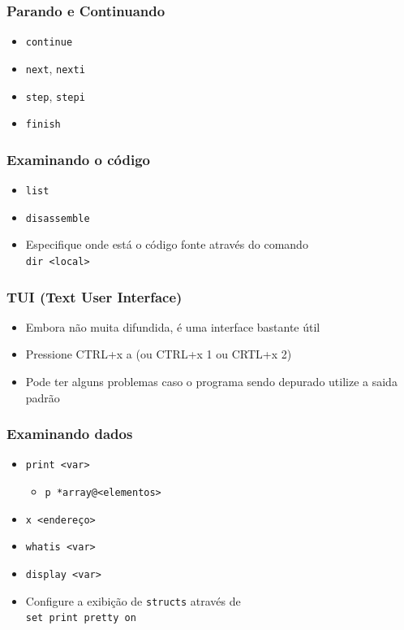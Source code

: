 \documentclass[xcolor=pdftex,dvipsnames,table,t]{beamer}
\begin{document}
\begin{frame}
	\frametitle{Parando e Continuando}
	  \begin{itemize}
	    \item \texttt{continue}
	    \item \texttt{next}, \texttt{nexti}
	    \item \texttt{step}, \texttt{stepi}
	    \item \texttt{finish}
	  \end{itemize}
\end{frame}

\begin{frame}
	\frametitle{Examinando o código}
	  \begin{itemize}
	    \item \texttt{list}
	    \item \texttt{disassemble}
	    \item Especifique onde está o código fonte através do comando \\
		  \texttt{dir <local>}
	  \end{itemize}
\end{frame}

\begin{frame}
	\frametitle{TUI (Text User Interface)}
	  \begin{itemize}
	    \item Embora não muita difundida, é uma interface bastante útil
	    \item Pressione CTRL+x a (ou CTRL+x 1 ou CRTL+x 2)
	    \item Pode ter alguns problemas caso o programa sendo depurado utilize a saida padrão
	  \end{itemize}
\end{frame}

\begin{frame}
	\frametitle{Examinando dados}
	  \begin{itemize}
	    \item \texttt{print <var>}
	    \begin{itemize}
	      \item \texttt{p *array@<elementos>}
	    \end{itemize}
	    \item \texttt{x <endereço>}
	    \item \texttt{whatis <var>}
	    \item \texttt{display <var>}
	    \item Configure a exibição de \texttt{structs} através de \\
		  \texttt{set print pretty on}
	  \end{itemize}
\end{frame}
\end{document}
